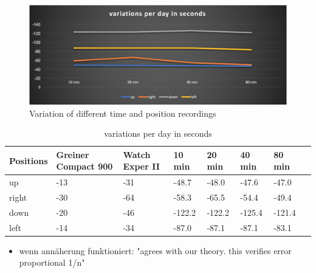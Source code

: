 \documentclass[12pt, a4paper]{report}
\begin{document}
    \noindent
    \begin{figure}[H]
        \includegraphics[scale=0.5]{Images/variations_per_day.png}
    
    \caption{ Variation of different time and position recordings}
    \end{figure}    
    
    \begin{table}[H]
      \centering
        \begin{tabularx}{\linewidth}{ |L|L|L|L|L|L|L|L|  }
        \hline
        {\fontsize{10}{12}\selectfont \textbf{Positions}} &{\fontsize{9}{10}\selectfont \textbf{Greiner Compact 900}} & {\fontsize{10}{12}\selectfont \textbf{Watch Exper II}} & {\fontsize{10}{12}\selectfont \textbf{10 min}} &  {\fontsize{10}{12}\selectfont \textbf{20 min}} &  {\fontsize{10}{12}\selectfont \textbf{40 min}} & {\fontsize{10}{12}\selectfont  \textbf{80 min}} \\ \hline
        up        & -13                 &      -31  & -48.7     & -48.0     & -47.6      & -47.0      \\ \hline
        right     & -30                 &      -64  & -58.3      & -65.5    & -54.4      & -49.4      \\ \hline
        down      & -20               &  -46  & -122.2    & -122.2     & -125.4    & -121.4      \\ \hline
        left      & -14                & -34 & -87.0	   & -87.1	  & -87.1	  & -83.1      \\ \hline
        \end{tabularx}
          \caption{ variations per day in seconds} 
    \end{table}
    
             \begin{itemize}
    \item wenn annäherung funktioniert: "agrees with our theory. this verifies error proportional 1/n"
    \end{itemize}
    
\end{document}
